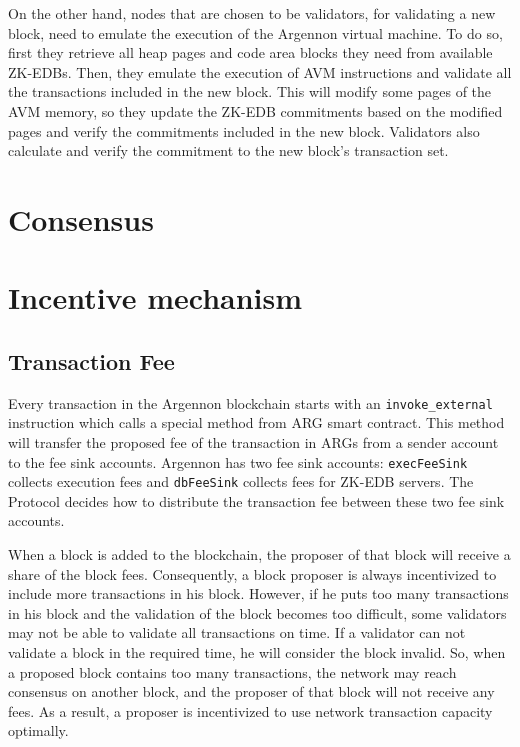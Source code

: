 On the other hand, nodes that are chosen to be validators, for validating a new block, need to emulate the
execution of the Argennon virtual machine. To do so, first they retrieve all heap pages and code area blocks they
need from available ZK-EDBs. Then, they emulate the execution of AVM instructions and validate all the
transactions included in the new block. This will modify some pages of the AVM memory, so they update the ZK-EDB
commitments based on the modified pages and verify the commitments included in the new block. Validators also
calculate and verify the commitment to the new block's transaction set.



\section{Consensus}\label{sec:consensus}


\section{Incentive mechanism}\label{sec:incentive-mechanism}

\subsection{Transaction Fee}\label{subsec:transaction-fee}

Every transaction in the Argennon blockchain starts with an \texttt{invoke\_external} instruction which calls a
special method from ARG smart contract. This method will transfer the proposed fee of the transaction in ARGs
from a sender account to the fee sink accounts. Argennon has two fee sink accounts: \texttt{execFeeSink} collects
execution fees and \texttt{dbFeeSink} collects fees for ZK-EDB servers. The Protocol decides how to distribute the
transaction fee between these two fee sink accounts.

When a block is added to the blockchain, the proposer of that block will receive a share of the block fees.
Consequently, a block proposer is always incentivized to include more transactions in his block. However, if he
puts too many transactions in his block and the validation of the block becomes too difficult, some validators
may not be able to validate all transactions on time. If a validator can not validate a block in the required
time, he will consider the block invalid. So, when a proposed block contains too many transactions, the network
may reach consensus on another block, and the proposer of that block will not receive any fees. As a result, a
proposer is incentivized to use network transaction capacity optimally.

